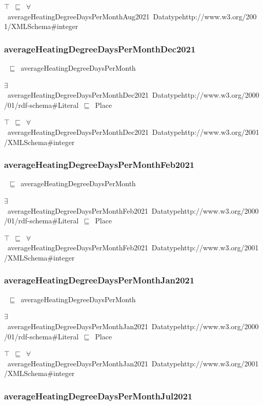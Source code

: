 \documentclass{article}
\begin{document}
\ensuremath{\top}~\ensuremath{\sqsubseteq}~\ensuremath{\forall}~averageHeatingDegreeDaysPerMonthAug2021~Datatypehttp://www.w3.org/2001/XMLSchema#integer

\subsubsection*{averageHeatingDegreeDaysPerMonthDec2021}

~\ensuremath{\sqsubseteq}~averageHeatingDegreeDaysPerMonth

\ensuremath{\exists}~averageHeatingDegreeDaysPerMonthDec2021~Datatypehttp://www.w3.org/2000/01/rdf-schema#Literal~\ensuremath{\sqsubseteq}~Place

\ensuremath{\top}~\ensuremath{\sqsubseteq}~\ensuremath{\forall}~averageHeatingDegreeDaysPerMonthDec2021~Datatypehttp://www.w3.org/2001/XMLSchema#integer

\subsubsection*{averageHeatingDegreeDaysPerMonthFeb2021}

~\ensuremath{\sqsubseteq}~averageHeatingDegreeDaysPerMonth

\ensuremath{\exists}~averageHeatingDegreeDaysPerMonthFeb2021~Datatypehttp://www.w3.org/2000/01/rdf-schema#Literal~\ensuremath{\sqsubseteq}~Place

\ensuremath{\top}~\ensuremath{\sqsubseteq}~\ensuremath{\forall}~averageHeatingDegreeDaysPerMonthFeb2021~Datatypehttp://www.w3.org/2001/XMLSchema#integer

\subsubsection*{averageHeatingDegreeDaysPerMonthJan2021}

~\ensuremath{\sqsubseteq}~averageHeatingDegreeDaysPerMonth

\ensuremath{\exists}~averageHeatingDegreeDaysPerMonthJan2021~Datatypehttp://www.w3.org/2000/01/rdf-schema#Literal~\ensuremath{\sqsubseteq}~Place

\ensuremath{\top}~\ensuremath{\sqsubseteq}~\ensuremath{\forall}~averageHeatingDegreeDaysPerMonthJan2021~Datatypehttp://www.w3.org/2001/XMLSchema#integer

\subsubsection*{averageHeatingDegreeDaysPerMonthJul2021}
\end{document}
